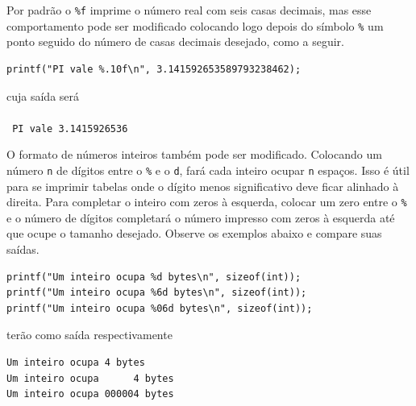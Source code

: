 Por padrão o {\tt \%f} imprime o número real com seis casas decimais, mas esse comportamento pode ser modificado colocando logo depois do símbolo {\tt \%} um ponto seguido do número de casas decimais desejado, como a seguir.

\begin{lstlisting}
printf("PI vale %.10f\n", 3.141592653589793238462);
\end{lstlisting}

cuja saída será\\
\\
{\tt
PI vale 3.1415926536\\
}

O formato de números inteiros também pode ser modificado. Colocando um número {\tt n} de dígitos entre o {\tt \%} e o {\tt d}, fará cada inteiro ocupar {\tt n} espaços. Isso é útil para se imprimir tabelas onde o dígito menos significativo deve ficar alinhado à direita. Para completar o inteiro com zeros à esquerda, colocar um zero entre o {\tt \%} e o número de dígitos completará o número impresso com zeros à esquerda até que ocupe o tamanho desejado. Observe os exemplos abaixo e compare suas saídas.

\pagebreak

\begin{lstlisting}
printf("Um inteiro ocupa %d bytes\n", sizeof(int));
printf("Um inteiro ocupa %6d bytes\n", sizeof(int));
printf("Um inteiro ocupa %06d bytes\n", sizeof(int));
\end{lstlisting}

terão como saída respectivamente

\begin{verbatim}
Um inteiro ocupa 4 bytes
Um inteiro ocupa      4 bytes
Um inteiro ocupa 000004 bytes
\end{verbatim}


